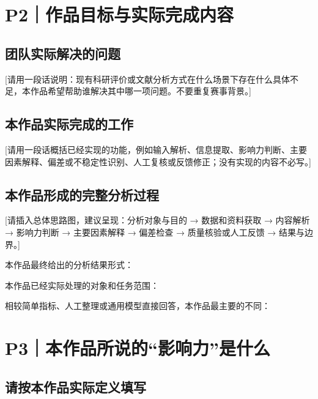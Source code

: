 \documentclass[letterpaper]{ctexart}
\newcommand{\fillin}[1]{\par\noindent #1\hrulefill\par}   %
\newcommand{\fillblank}{\par\noindent \hrulefill\par}     %
\begin{document}
\section{P2｜作品目标与实际完成内容}

\subsection{团队实际解决的问题}

{\small [请用一段话说明：现有科研评价或文献分析方式在什么场景下存在什么具体不足，本作品希望帮助谁解决其中哪一项问题。不要重复赛事背景。]}

\fillblank

\subsection{本作品实际完成的工作}

{\small [请用一段话概括已经实现的功能，例如输入解析、信息提取、影响力判断、主要因素解释、偏差或不稳定性识别、人工复核或反馈修正；没有实现的内容不必写。]}

\fillblank

\subsection{本作品形成的完整分析过程}

{\small [请插入总体思路图，建议呈现：分析对象与目的 → 数据和资料获取 → 内容解析 → 影响力判断 → 主要因素解释 → 偏差检查 → 质量核验或人工反馈 → 结果与边界。]}

\fillin{本作品最终给出的分析结果形式：}
\fillin{本作品已经实际处理的对象和任务范围：}
\fillin{相较简单指标、人工整理或通用模型直接回答，本作品最主要的不同：}

\clearpage
\section{P3｜本作品所说的“影响力”是什么}

\subsection{请按本作品实际定义填写}
\end{document}
